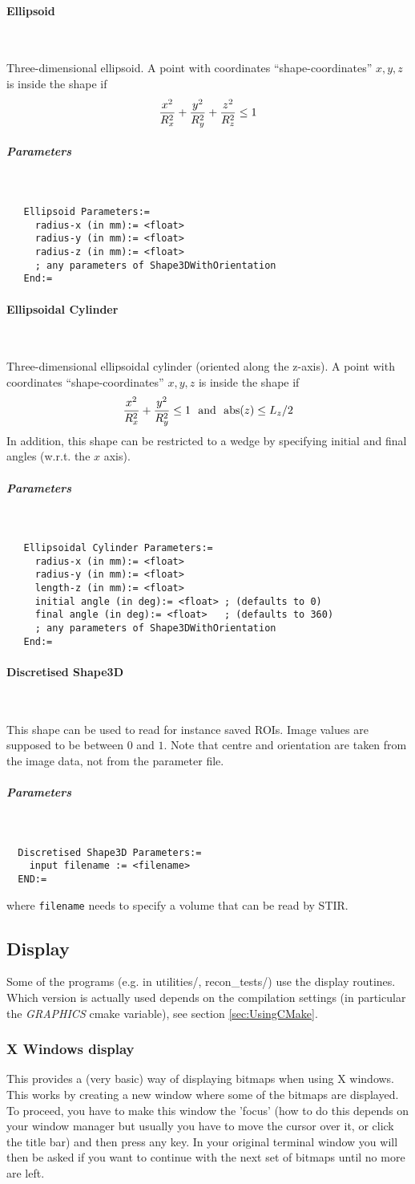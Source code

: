 \documentclass{article}
\newcommand{\subsubsubsection}[1]{\paragraph{#1}\mbox{} \\}
\newcommand{\subsubsubsubsection}[1]{\subparagraph{#1} \mbox{} \\}
\begin{document}
{{{{ \subsubsubsection{Ellipsoid}
}
Three-dimensional ellipsoid.
A point with coordinates ``shape-coordinates'' $x,y,z$ is inside the shape if
\[
  {x^2 \over R_x^2} + {y^2 \over R_y^2} + {z^2 \over R_z^2} \le 1
\]
{ \subsubsubsubsection{Parameters}
}
\begin{verbatim}
   Ellipsoid Parameters:=
     radius-x (in mm):= <float>
     radius-y (in mm):= <float>
     radius-z (in mm):= <float>
     ; any parameters of Shape3DWithOrientation
   End:=
\end{verbatim}

{ \subsubsubsection{Ellipsoidal Cylinder}
}
Three-dimensional ellipsoidal cylinder (oriented along the z-axis).
A point with coordinates ``shape-coordinates'' $x,y,z$ is inside the shape if
\[
  {x^2 \over R_x^2} + {y^2 \over R_y^2}  \le 1 \,\,\,\, \mathrm{and}  \,\,\,\,\mathrm{abs}(z) \le L_z/2
\]
In addition, this shape can be restricted to a wedge by specifying initial and final angles (w.r.t. the $x$ axis).
\subsubsubsubsection{Parameters}
\begin{verbatim}
   Ellipsoidal Cylinder Parameters:=
     radius-x (in mm):= <float>
     radius-y (in mm):= <float>
     length-z (in mm):= <float>
     initial angle (in deg):= <float> ; (defaults to 0)
     final angle (in deg):= <float>   ; (defaults to 360)
     ; any parameters of Shape3DWithOrientation
   End:=
\end{verbatim}

{ \subsubsubsection{Discretised Shape3D}
}
This shape can be used to read for instance saved ROIs. Image values are supposed to be between $0$ and $1$.
Note that centre and orientation are taken from the image data, not from the parameter file.
{ \subsubsubsubsection{Parameters}
}
\begin{verbatim}
  Discretised Shape3D Parameters:=
    input filename := <filename>
  END:=
\end{verbatim}
where \texttt{filename} needs to specify a volume that can be read by STIR.


\subsection{
Display}

Some of the programs (e.g. in utilities/, recon\_tests/) use 
the display routines. Which version is actually used depends 
on the compilation settings (in particular the \textit{GRAPHICS} cmake 
variable), see section \ref{sec:UsingCMake}. 


\subsubsection{
X Windows display}
\label{sec:display}
This provides a (very basic) way of displaying bitmaps when using 
X windows. This works by creating a new window where some of 
the bitmaps are displayed. To proceed, you have to make this 
window the 'focus' (how to do this depends on your window manager 
but usually you have to move the cursor over it, or click the 
title bar) and then press any key. In your original terminal 
window you will then be asked if you want to continue with the 
next set of bitmaps until no more are left.


}}}
\end{document}
